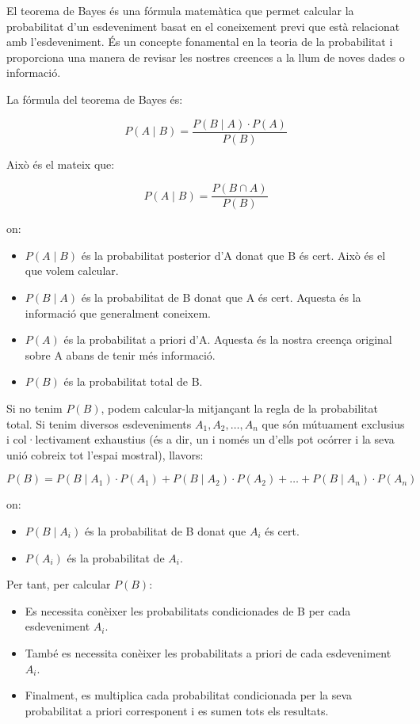\documentclass[12pt]{article}
\begin{document}
\begin{concept} [title=Definició] \noindent
El teorema de Bayes és una fórmula matemàtica que permet calcular la probabilitat d'un esdeveniment basat en el coneixement previ que està relacionat amb l'esdeveniment. És un concepte fonamental en la teoria de la probabilitat i proporciona una manera de revisar les nostres creences a la llum de noves dades o informació.

La fórmula del teorema de Bayes és:

\[
P(A \mid B) = \frac{P(B \mid A) \cdot P(A)}{P(B)}
\]

Això és el mateix que:

\[
P(A \mid B) = \frac{P(B \cap A)}{P(B)}
\]

on:
\begin{itemize}
    \item \( P(A \mid B) \) és la probabilitat posterior d'A donat que B és cert. Això és el que volem calcular.
    \item \( P(B \mid A) \) és la probabilitat de B donat que A és cert. Aquesta és la informació que generalment coneixem.
    \item \( P(A) \) és la probabilitat a priori d'A. Aquesta és la nostra creença original sobre A abans de tenir més informació.
    \item \( P(B) \) és la probabilitat total de B.
\end{itemize}

Si no tenim \( P(B) \), podem calcular-la mitjançant la regla de la probabilitat total. Si tenim diversos esdeveniments \( A_1, A_2, \dots, A_n \) que són mútuament exclusius i col·lectivament exhaustius (és a dir, un i només un d'ells pot ocórrer i la seva unió cobreix tot l'espai mostral), llavors:

\[
P(B) = P(B \mid A_1) \cdot P(A_1) + P(B \mid A_2) \cdot P(A_2) + \dots + P(B \mid A_n) \cdot P(A_n)
\]

on:
\begin{itemize}
    \item \( P(B \mid A_i) \) és la probabilitat de B donat que \( A_i \) és cert.
    \item \( P(A_i) \) és la probabilitat de \( A_i \).
\end{itemize}

Per tant, per calcular \( P(B) \):

\begin{itemize}
    \item Es necessita conèixer les probabilitats condicionades de B per cada esdeveniment \( A_i \).
    \item També es necessita conèixer les probabilitats a priori de cada esdeveniment \( A_i \).
    \item Finalment, es multiplica cada probabilitat condicionada per la seva probabilitat a priori corresponent i es sumen tots els resultats.
\end{itemize}

\end{concept}
\end{document}
